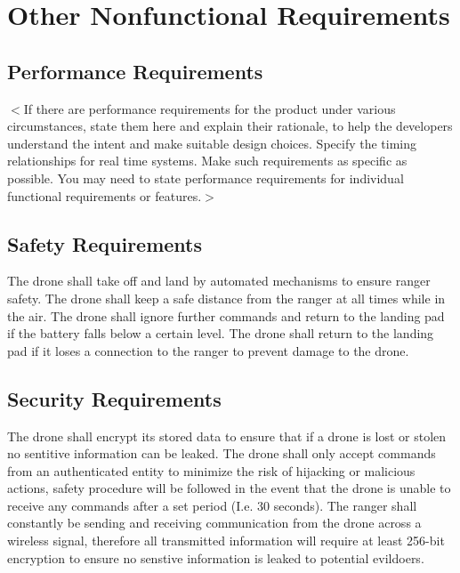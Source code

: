 \chapter{Other Nonfunctional Requirements}

\section{Performance Requirements}
$<$If there are performance requirements for the product under various
circumstances, state them here and explain their rationale, to help the
developers understand the intent and make suitable design choices. Specify the
timing relationships for real time systems. Make such requirements as specific
as possible. You may need to state performance requirements for individual
functional requirements or features.$>$

\section{Safety Requirements}

\begin{flushleft}
	The drone shall take off and land by automated mechanisms to ensure ranger safety.
	\newline
	The drone shall keep a safe distance from the ranger at all times while in the air.
	\newline
	The drone shall ignore further commands and return to the landing pad if the battery falls below a certain level.
	\newline
	The drone shall return to the landing pad if it loses a connection to the ranger to prevent damage to the drone.
	\newline
\end{flushleft}
\section{Security Requirements}
\begin{flushleft}
	The drone shall encrypt its stored data to ensure that if a drone is lost or stolen no sentitive information can be leaked.
	\newline
	The drone shall only accept commands from an authenticated entity to minimize the risk of hijacking or malicious actions, 
	safety procedure will be followed in the event that the drone is unable to receive any commands after a set period (I.e. 30 seconds).
	\newline
	The ranger shall constantly be sending and receiving communication from the drone across a wireless signal,
	therefore all transmitted information will require at least 256-bit encryption to ensure no senstive information is leaked to potential evildoers.
	\newline
\end{flushleft}

